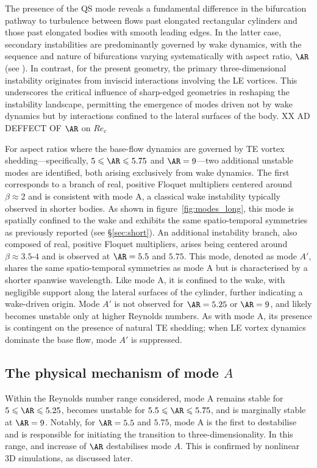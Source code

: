 The presence of the QS mode reveals a fundamental difference in the bifurcation pathway to turbulence between flows past elongated rectangular cylinders and those past elongated bodies with smooth leading edges. In the latter case, secondary instabilities are predominantly governed by wake dynamics, with the sequence and nature of bifurcations varying systematically with aspect ratio, $\AR$ (see \cite{}). In contrast, for the present geometry, the primary three-dimensional instability originates from inviscid interactions involving the LE vortices. This underscores the critical influence of sharp-edged geometries in reshaping the instability landscape, permitting the emergence of modes driven not by wake dynamics but by interactions confined to the lateral surfaces of the body.
XX AD DEFFECT OF $\AR$ on $Re_{c}$

For aspect ratios where the base-flow dynamics are governed by TE vortex shedding---specifically, $5 \le \AR \le 5.75$ and $\AR = 9$---two additional unstable modes are identified, both arising exclusively from wake dynamics. The first corresponds to a branch of real, positive Floquet multipliers centered around $\beta \approx 2$ and is consistent with mode A, a classical wake instability typically observed in shorter bodies. As shown in figure~\ref{fig:modes_long}, this mode is spatially confined to the wake and exhibits the same spatio-temporal symmetries as previously reported (see \S\ref{sec:short}).
%
An additional  instability branch, also composed of real, positive Floquet multipliers, arises being centered around $\beta \approx 3.5$-$4$ and is observed at $\AR = 5.5$ and $5.75$. This mode, denoted as mode $A'$, shares the same spatio-temporal symmetries as mode A but is characterised by a shorter spanwise wavelength. Like mode A, it is confined to the wake, with negligible support along the lateral surfaces of the cylinder, further indicating a wake-driven origin. Mode $A'$ is not observed for $\AR = 5.25$ or $\AR = 9$, and likely becomes unstable only at higher Reynolds numbers. As with mode A, its presence is contingent on the presence of natural TE shedding; when LE vortex dynamics dominate the base flow, mode $A'$ is suppressed.

\subsection{The physical mechanism of mode $A$}

Within the Reynolds number range considered, mode A remains stable for $5 \le \AR \le 5.25$, becomes unstable for $5.5 \le \AR \le 5.75$, and is marginally stable at $\AR = 9$. Notably, for $\AR = 5.5$ and $5.75$, mode A is the first to destabilise and is responsible for initiating the transition to three-dimensionality. In this range, and increase of $\AR$ destabilises mode $A$. This is confirmed by nonlinear 3D simulations, as discussed later.

